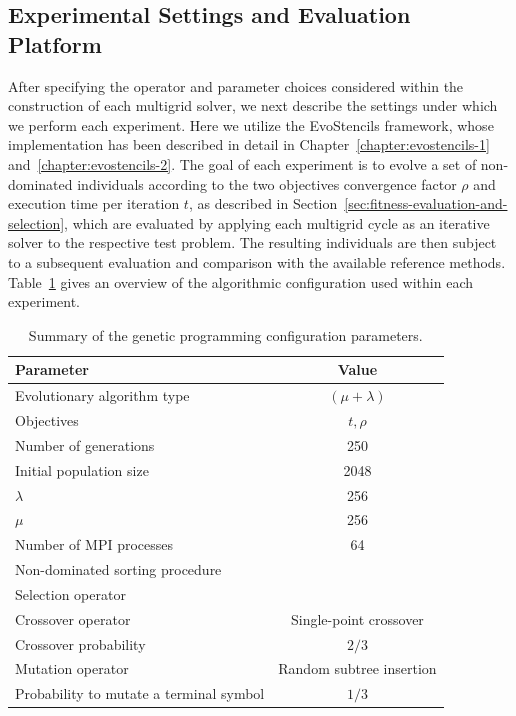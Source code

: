 \subsection{Experimental Settings and Evaluation Platform}
\label{sec:optimization-settings}
After specifying the operator and parameter choices considered within the construction of each multigrid solver, we next describe the settings under which we perform each experiment.
Here we utilize the EvoStencils framework, whose implementation has been described in detail in Chapter~\ref{chapter:evostencils-1} and~\ref{chapter:evostencils-2}.
The goal of each experiment is to evolve a set of non-dominated individuals according to the two objectives convergence factor $\rho$ and execution time per iteration $t$, as described in Section~\ref{sec:fitness-evaluation-and-selection}, which are evaluated by applying each multigrid cycle as an iterative solver to the respective test problem.
The resulting individuals are then subject to a subsequent evaluation and comparison with the available reference methods. 
Table~\ref{table:gp-parameters} gives an overview of the algorithmic configuration used within each experiment.
\begin{table}
	\centering
	\caption{Summary of the genetic programming configuration parameters.}
	\label{table:gp-parameters}
	\begin{tabular}{l c}
		\toprule
		Parameter & Value \\
		\midrule 
		Evolutionary algorithm type & $(\mu + \lambda)$ \\
		\midrule
		Objectives & $t, \rho$ \\
		\midrule
		Number of generations & 250 \\
		\midrule
		Initial population size & 2048 \\
		\midrule
		$\lambda$ & 256 \\
		\midrule
		$\mu$ & 256 \\
		\midrule
		Number of MPI processes & 64 \\
		\midrule
		Non-dominated sorting procedure & \cite{deb2002fast} \\ 
		\midrule
		Selection operator & \cite{deb2002fast} \\ 
		\midrule
		Crossover operator & Single-point crossover \\
		\midrule
		Crossover probability & $2/3$ \\
		\midrule
		Mutation operator & Random subtree insertion \\
		\midrule 
		Probability to mutate a terminal symbol & $1/3$ \\
		\bottomrule
	\end{tabular}
\end{table}
